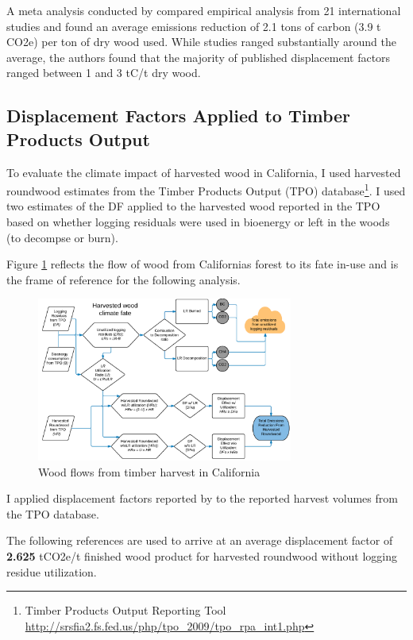 \documentclass[a4paper]{article}
\begin{document}
A meta analysis conducted by \citep{Sathre2010} compared empirical analysis from 21 international studies and found an
average emissions reduction of 2.1 tons of carbon (3.9 t CO2e) per ton
of dry wood used. While studies ranged substantially around the average, the
authors found that the majority of published displacement factors ranged
between 1 and 3 tC/t dry wood. 

\subsection{Displacement Factors Applied to Timber Products Output}
\label{sec-3-5}

To evaluate the climate impact of harvested wood in California, I used
harvested roundwood estimates from the Timber Products Output (TPO)
database\footnote{Timber Products Output Reporting Tool \href{http://srsfia2.fs.fed.us/php/tpo_2009/tpo_rpa_int1.php}{\url{http://srsfia2.fs.fed.us/php/tpo_2009/tpo_rpa_int1.php}}}. I used two estimates of the DF applied
to the harvested wood reported in the TPO based on whether logging
residuals were used in bioenergy or left in the woods (to decompse or
burn).

Figure \ref{fig:flow_chart} reflects the flow of wood
from Californias forest to its fate in-use and is the frame of
reference for the following analysis.

\begin{figure}[htb]
\centering
\includegraphics[width=0.75\textwidth]{./graphics/flow_chart.pdf}
\caption{Wood flows from timber harvest in California \label{fig:flow_chart}}
\end{figure}


I applied displacement factors reported by \cite{Sathre2010} to the
reported harvest volumes from the TPO database. 


The following references are used to
arrive at an average displacement factor of \textbf{2.625} tCO2e/t finished
wood product for harvested roundwood without
logging residue utilization.
\end{document}
